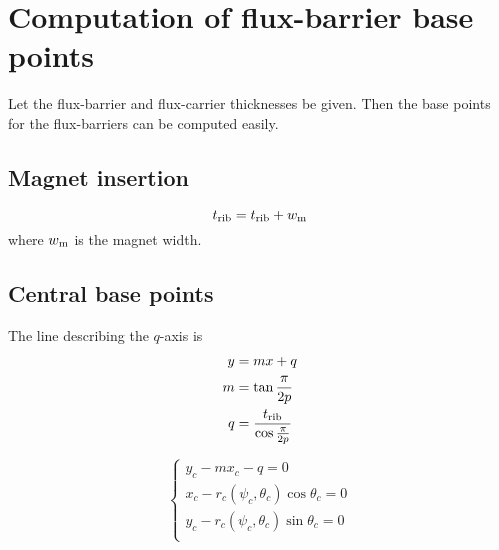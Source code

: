 \documentclass[b5paper,11pt,oneside,fleqn]{article}
\newcommand{\ped}[1]{_\textup{#1}}
\newcommand{\trib}[1][]{t\ped{rib#1}}
\begin{document}
\section{Computation of flux-barrier base points}
Let the flux-barrier and flux-carrier thicknesses be given.
Then the base points for the flux-barriers can be computed easily.





\subsection{Magnet insertion}
\[
\trib = \trib + w\ped{m}
\]
where $ w\ped{m} $ is the magnet width.


\subsection{Central base points}
The line describing the $ q $-axis is
\begin{equation}
\begin{aligned}
y &= m x + q \\
m &= \tan\frac{\pi}{2p} \\
q &= \frac{\trib}{\cos\frac{\pi}{2p}}
\end{aligned}
\end{equation}

\begin{equation}
\begin{cases}
y_c - m x_c - q = 0 \\
x_c - r_c(\psi_c,\theta_c) \cos\theta_c = 0 \\
y_c - r_c(\psi_c,\theta_c) \sin\theta_c = 0 \\
\end{cases}
\end{equation}
\end{document}
